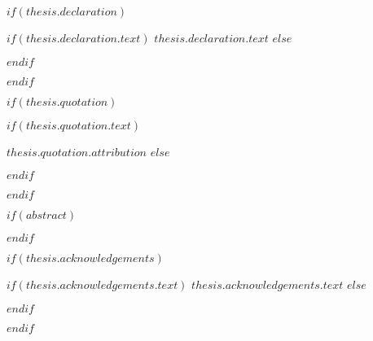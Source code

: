 $if(thesis.declaration)$
\begin{declaration}
\addchaptertocentry{\authorshipname} %
$if(thesis.declaration.text)$
$thesis.declaration.text$
$else$

$endif$

\end{declaration}

\cleardoublepage
$endif$

$if(thesis.quotation)$

\vspace*{0.2\textheight}

$if(thesis.quotation.text)$
\bigbreak

\hfill $thesis.quotation.attribution$
$else$

$endif$

$endif$

$if(abstract)$

\begin{abstract}
\addchaptertocentry{\abstractname} %
$abstract$
\end{abstract}

$endif$

$if(thesis.acknowledgements)$

\begin{acknowledgements}
\addchaptertocentry{\acknowledgementname} %
$if(thesis.acknowledgements.text)$
$thesis.acknowledgements.text$
$else$

$endif$
\end{acknowledgements}

$endif$


